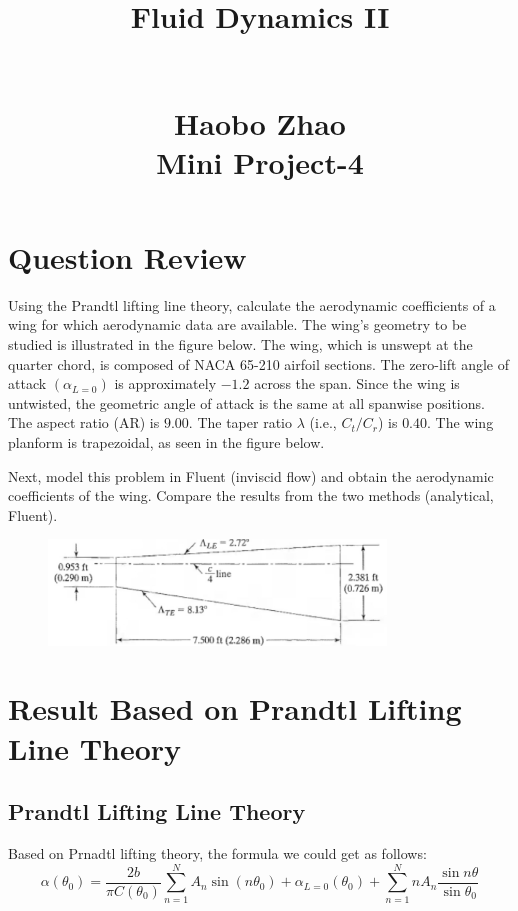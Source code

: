 \documentclass[12pt]{article}
\begin{document}
\title{\begin{Huge}Fluid Dynamics II\end{Huge}\\Haobo Zhao\\Mini Project-4}
\maketitle

\tableofcontents


\section{Question Review}

Using the Prandtl lifting line theory, calculate the aerodynamic coefficients of a wing for which aerodynamic data are available. The wing's geometry to be studied is illustrated in the figure below. The wing, which is unswept at the quarter chord, is composed of NACA 65-210 airfoil sections. The zero-lift angle of attack $(\alpha_{L=0})$ is approximately $-1.2$ across the span. Since the wing is untwisted, the geometric angle of attack is the same at all spanwise positions. The aspect ratio (AR) is $9.00$. The taper ratio $\lambda$ (i.e., $C_t/C_r$) is $0.40$. The wing planform is trapezoidal, as seen in the figure below.

Next, model this problem in Fluent (inviscid flow) and obtain the aerodynamic coefficients of the wing. Compare the results from the two methods (analytical, Fluent).

\begin{figure}[H]
    \centering
    \includegraphics[width=0.8\textwidth]{Latex/figure/Win.jpg}
    \label{IGs.jpg}
\end{figure}






\section{Result Based on Prandtl Lifting Line Theory}

\subsection{Prandtl Lifting Line Theory}
Based on Prnadtl lifting theory, the formula we could get as follows:
$$
\alpha(\theta_0) = \frac{2b}{\pi C(\theta_0)} \sum_{n=1}^{N} A_n \sin(n \theta_0) + \alpha_{L=0}(\theta_0) + \sum_{n=1}^{N} n A_n \frac{\sin n \theta}{\sin \theta_0}
$$
\end{document}

